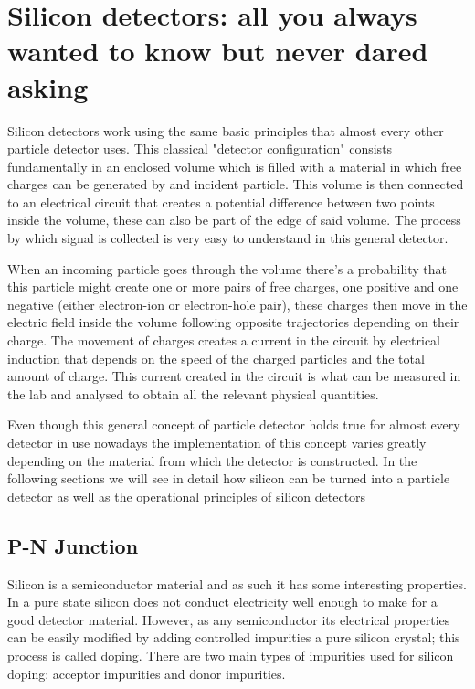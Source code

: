 \chapter{Silicon detectors: all you always wanted to know but never dared asking} %
\label{cha:simulator_development}

Silicon detectors work using the same basic principles that almost every other particle detector uses. This classical "detector configuration" consists fundamentally in an enclosed volume which is filled with a material in which free charges can be generated by and incident particle. This volume is then connected to an electrical circuit that creates a  potential difference between two points inside the volume, these can also be part of the edge of said volume. The process by which signal is collected is very easy to understand in this general detector.

When an incoming particle goes through the volume there's a probability that this particle might create one or more pairs of free charges, one positive and one negative (either electron-ion or electron-hole pair), these charges then move in the electric field inside the volume following opposite trajectories depending on their charge. The movement of charges creates a current in the circuit by electrical induction that depends on the speed of the charged particles and the total amount of charge. This current created in the circuit is what can be measured in the lab and analysed to obtain all the relevant physical quantities.

Even though this general concept of particle detector holds true for almost every detector in use nowadays the implementation of this concept varies greatly depending on the material from which the detector is constructed. In the following sections we will see in detail how silicon can be turned into a particle detector as well as the operational principles of silicon detectors

\section{P-N Junction}

Silicon is a semiconductor material and as such it has some interesting properties. In a pure state silicon does not conduct electricity well enough to make for a good detector material. However, as any semiconductor its electrical properties can be easily modified by adding controlled impurities a pure silicon crystal; this process is called doping. There are two main types of impurities used for silicon doping: acceptor impurities and donor impurities.

